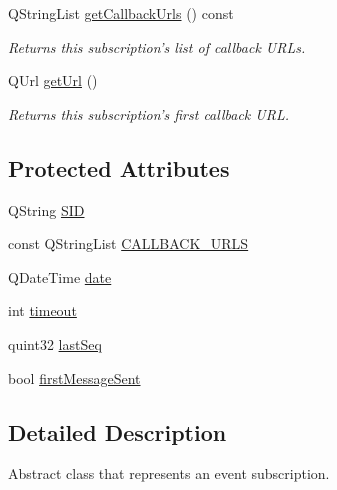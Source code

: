 \begin{DoxyCompactItemize}
QStringList \hyperlink{classBrisaUpnp_1_1BrisaAbstractEventSubscription_afb94634112ce0e3813e48130f46afb1d}{getCallbackUrls} () const 
\begin{DoxyCompactList}\small\item\em Returns this subscription's list of callback URLs. \item\end{DoxyCompactList}\item 
QUrl \hyperlink{classBrisaUpnp_1_1BrisaAbstractEventSubscription_a4d20b50a2d27923138d42d036a1416cd}{getUrl} ()
\begin{DoxyCompactList}\small\item\em Returns this subscription's first callback URL. \item\end{DoxyCompactList}\end{DoxyCompactItemize}
\subsection*{Protected Attributes}
\begin{DoxyCompactItemize}
\item 
QString \hyperlink{classBrisaUpnp_1_1BrisaAbstractEventSubscription_a62a26b420298aeb1b184d9b25133d6c4}{SID}
\item 
const QStringList \hyperlink{classBrisaUpnp_1_1BrisaAbstractEventSubscription_a976193e5caf8de65f6ca6efb1e4f5587}{CALLBACK\_\-URLS}
\item 
QDateTime \hyperlink{classBrisaUpnp_1_1BrisaAbstractEventSubscription_ab85f792d439a9ae1f90aab4c7f3c9082}{date}
\item 
int \hyperlink{classBrisaUpnp_1_1BrisaAbstractEventSubscription_afb99d42e318e002acc44740a2ca7881a}{timeout}
\item 
quint32 \hyperlink{classBrisaUpnp_1_1BrisaAbstractEventSubscription_afc8085c81885cf3bcbfa670453103f2c}{lastSeq}
\item 
bool \hyperlink{classBrisaUpnp_1_1BrisaAbstractEventSubscription_a82c9da7926d293e74f85e86ef039dd09}{firstMessageSent}
\end{DoxyCompactItemize}


\subsection{Detailed Description}
Abstract class that represents an event subscription. 

